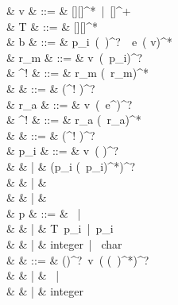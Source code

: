\documentclass[a4paper]{article}
\begin{document}
{
\small
\begin{grammar}
             & v            & ::= & [][]^*\ |\ \code{\_}[]^+ \\
        & T            & ::= & [][]^* \\
                      & b            & ::= & p_i\ (\code{:}\ \tau)^?\ \code{=}\ e\ (\code{!} v)^* \\
              & r_m              & ::= & v\ (\code{=}\ p_i)^? \\
      & ^! & ::= & r_m (\code{,}\ r_m)^* \\
             &    & ::= & (^! \code{,})^?\  \\
            & r_a              & ::= & v\ (\code{=}\ e^{})^? \\
    & ^! & ::= & r_a (\code{,}\ r_a)^* \\
           &    & ::= & (^! \code{,})^?\  \\
          & p_i          & ::= & v\ (\code{\{}  \code{\}})^? \\
                                    &              & |   & \code{(} (p_i (\code{,}\ p_i)^*)^? \code{)} \\
                                    &              & |   & \code{\#} \code{\{}  \code{\}} \\
                                    &              & |   & \code{\_} \\
                      & p            & ::= & \ |\  \\
                                    &              & |   & T\ p_i\ |\ p_i \\
                                    &              & |   & integer\ |\  char  \\
                         & \varepsilon  & ::= & ()^?\ v\ (\code{[} \tau (\code{,}\ \tau)^*\code{]})^? \\
                                    &              & |   & \ |\  \\
                                    &              & |   & integer \\

\end{grammar}}
\end{document}
